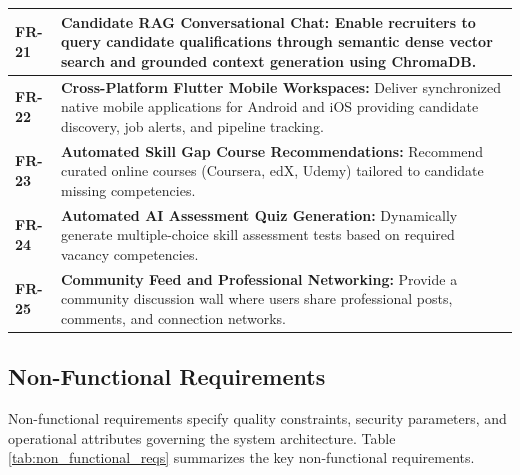 \begin{table}[H]
\begin{tabular}{|l|p{12cm}|}
\textbf{FR-21} & \textbf{Candidate RAG Conversational Chat:} Enable recruiters to query candidate qualifications through semantic dense vector search and grounded context generation using ChromaDB. \\ \hline
\textbf{FR-22} & \textbf{Cross-Platform Flutter Mobile Workspaces:} Deliver synchronized native mobile applications for Android and iOS providing candidate discovery, job alerts, and pipeline tracking. \\ \hline
\textbf{FR-23} & \textbf{Automated Skill Gap Course Recommendations:} Recommend curated online courses (Coursera, edX, Udemy) tailored to candidate missing competencies. \\ \hline
\textbf{FR-24} & \textbf{Automated AI Assessment Quiz Generation:} Dynamically generate multiple-choice skill assessment tests based on required vacancy competencies. \\ \hline
\textbf{FR-25} & \textbf{Community Feed and Professional Networking:} Provide a community discussion wall where users share professional posts, comments, and connection networks. \\ \hline
\end{tabular}
\end{table}

\subsection{Non-Functional Requirements}
Non-functional requirements specify quality constraints, security parameters, and operational attributes governing the system architecture. Table \ref{tab:non_functional_reqs} summarizes the key non-functional requirements.

